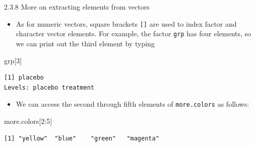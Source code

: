 \documentclass[
  9pt,
  a4paper,
  ignorenonframetext,
  notheorems]{beamer}
\newenvironment{Shaded}{\begin{snugshade}}{\end{snugshade}}
\newcommand{\DecValTok}[1]{\textcolor[rgb]{0.68,0.00,0.00}{#1}}
\newcommand{\NormalTok}[1]{\textcolor[rgb]{0.00,0.23,0.31}{#1}}
\newcommand{\SpecialCharTok}[1]{\textcolor[rgb]{0.37,0.37,0.37}{#1}}
\providecommand{\tightlist}{%
  \setlength{\itemsep}{0pt}\setlength{\parskip}{0pt}}\usepackage{longtable,booktabs,array}
\begin{document}
\begin{frame}[fragile]{2.3.8 More on extracting elements from vectors}
\protect\hypertarget{more-on-extracting-elements-from-vectors}{}
\begin{itemize}
\tightlist
\item
  As for numeric vectors, square brackets \texttt{{[}{]}} are used to
  index factor and character vector elements. For example, the factor
  \texttt{grp} has four elements, so we can print out the third element
  by typing
\end{itemize}

\begin{Shaded}
\begin{Highlighting}[]
\NormalTok{grp[}\DecValTok{3}\NormalTok{]}
\end{Highlighting}
\end{Shaded}

\begin{verbatim}
[1] placebo
Levels: placebo treatment
\end{verbatim}

\begin{itemize}
\tightlist
\item
  We can access the second through fifth elements of
  \texttt{more.colors} as follows:
\end{itemize}

\begin{Shaded}
\begin{Highlighting}[]
\NormalTok{more.colors[}\DecValTok{2}\SpecialCharTok{:}\DecValTok{5}\NormalTok{]}
\end{Highlighting}
\end{Shaded}

\begin{verbatim}
[1] "yellow"  "blue"    "green"   "magenta"
\end{verbatim}
\end{frame}
\end{document}
